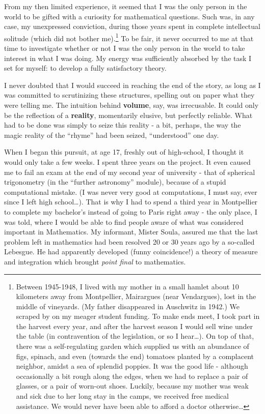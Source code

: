 From my then limited experience, it seemed that I was the only person in the world to be
gifted with a curiosity for mathematical questions. Such was, in any case, my unexpressed
conviction, during those years spent in complete intellectual solitude (which did not
bother me).\footnote{Between 1945-1948, I lived with my mother in a small hamlet about 10
kilometers away from Montpellier, Mairargues (near Vendargues), lost in the middle of
vineyards. (My father disappeared in Auschwitz in 1942.) We scraped by on my meager
student funding. To make ends meet, I took part in the harvest every year, and after the
harvest season I would sell wine under the table (in contravention of the legislation, or
so I hear\ldots). On top of that, there was a self-regulating garden which 
supplied us with an abundance of
figs, spinach, and
even (towards the end) tomatoes planted by a complacent neighbor,
amidst a sea of splendid poppies.
It was the good life - although occasionally a bit rough along the edges, when we had to
replace a pair of glasses, or a pair of worn-out shoes. Luckily, because my mother was
weak and sick due to her long stay in the camps, we received free medical assistance. We
would never have been able to afford a doctor otherwise\ldots}
To be fair, it never occurred to me at that time to investigate
whether or not I was the
only person in the world to take interest in what I was doing. 
My energy was sufficiently absorbed by the task I set for myself: to develop a fully
satisfactory theory.

I never doubted that I would succeed in reaching the end of the story, as long as I was
committed to scrutinizing these structures, spelling out on paper what they were telling
me. The intuition behind \textbf{volume}, say, was irrecusable. It could only be the
reflection of a \textbf{reality}, momentarily elusive, but perfectly reliable. What had to
be done was simply to seize this reality - a bit, perhaps, the way the magic reality of
the ``rhyme'' had been seized, ``understood'' one day. 

When I began this pursuit, at age 17, freshly out of high-school, I thought it would only
take a few weeks. 
I spent three years on the project. It even caused me to fail an exam at the end of my
second year of university - that of spherical trigonometry (in the ``further astronomy''
module), because of a stupid computational mistake.
(I was never very good at computations, I must say, ever since I left high school\ldots).
That is why I had to spend a third year in Montpellier to complete
my bachelor's instead of going to Paris right away - the only place, I was told, where I
would be able to find people aware of what was considered important in Mathematics.
My informant, Mister Soula, assured me that the last problem left in mathematics had been
resolved 20 or 30 years ago by a so-called Lebesgue. 
He had apparently developed (funny coincidence!) a theory of measure and integration which
brought \emph{point final} to mathematics. 

